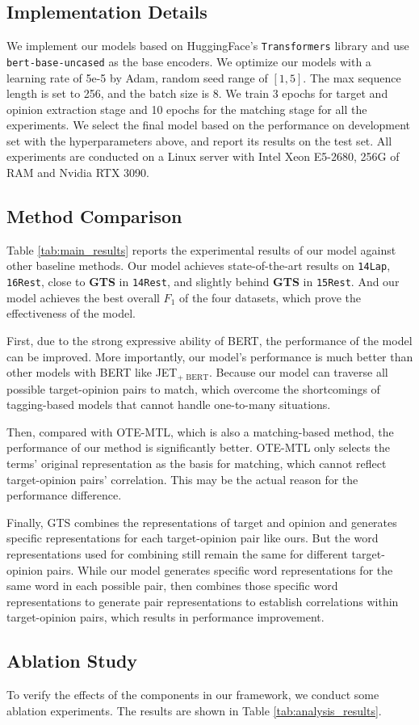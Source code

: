 \documentclass[11pt]{article}
\begin{document}
\subsection{Implementation Details}
We implement our models based on HuggingFace’s \texttt{Transformers} library \cite{wolf-etal-2020-transformers} and use \texttt{bert-base-uncased} \cite{devlin2018bert} as the base encoders. We optimize our models with a learning rate of 5e-5 by Adam, random seed range of $[1, 5]$. The max sequence length is set to 256, and the batch size is 8. We train 3 epochs for target and opinion extraction stage and 10 epochs for the matching stage for all the experiments.
We select the final model based on the performance on development set with the hyperparameters above, and report its results on the test set.
All experiments are conducted on a Linux server with Intel Xeon E5-2680, 256G of RAM and Nvidia RTX 3090. 



\subsection{Method Comparison}
Table \ref{tab:main_results} reports the experimental results of our model against other baseline methods. Our model achieves state-of-the-art results on \texttt{14Lap}, \texttt{16Rest}, close to \textbf{GTS} in \texttt{14Rest}, and slightly behind \textbf{GTS} in \texttt{15Rest}. And our model achieves the best overall $F_1$ of the four datasets, which prove the effectiveness of the model.

First, due to the strong expressive ability of BERT,
the performance of the model can be improved. 
More importantly, our model's performance is much better than other models with BERT like  {JET}$_{\scriptscriptstyle \text{+ BERT}}$. 
Because our model can traverse all possible target-opinion pairs to match, which overcome the shortcomings of tagging-based models that cannot handle one-to-many situations.

Then, compared with OTE-MTL, which is also a matching-based method, the performance of our method is significantly better. OTE-MTL only selects the terms' original representation as the basis for matching, which cannot reflect target-opinion pairs' correlation. This may be the actual reason for the performance difference. 

Finally, GTS combines the representations of target and opinion and generates specific representations for each target-opinion pair like ours. But the word representations used for combining still remain the same for different target-opinion pairs. While our model generates specific word representations for the same word in each possible pair, then combines those specific word representations to generate pair representations to establish correlations within target-opinion pairs, which results in performance improvement. \subsection{Ablation Study}
To verify the effects of the components in our framework, we conduct some ablation experiments. The results are shown in Table \ref{tab:analysis_results}. 
\end{document}
